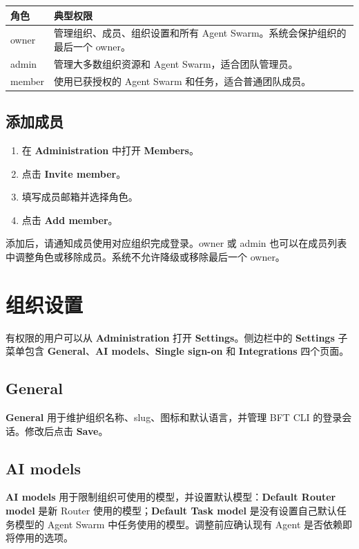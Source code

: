 \documentclass[UTF8,a4paper,11pt]{ctexart}
\begin{document}
\begin{longtable}{p{3cm}p{10.8cm}}
\toprule
角色 & 典型权限 \\
\midrule
owner & 管理组织、成员、组织设置和所有 Agent Swarm。系统会保护组织的最后一个 owner。 \\
admin & 管理大多数组织资源和 Agent Swarm，适合团队管理员。 \\
member & 使用已获授权的 Agent Swarm 和任务，适合普通团队成员。 \\
\bottomrule
\end{longtable}

\subsection{添加成员}

\begin{enumerate}
  \item 在 \textbf{Administration} 中打开 \textbf{Members}。
  \item 点击 \textbf{Invite member}。
  \item 填写成员邮箱并选择角色。
  \item 点击 \textbf{Add member}。
\end{enumerate}

添加后，请通知成员使用对应组织完成登录。owner 或 admin 也可以在成员列表中调整角色或移除成员。系统不允许降级或移除最后一个 owner。

\section{组织设置}

有权限的用户可以从 \textbf{Administration} 打开 \textbf{Settings}。侧边栏中的 \textbf{Settings} 子菜单包含 \textbf{General}、\textbf{AI models}、\textbf{Single sign-on} 和 \textbf{Integrations} 四个页面。

\subsection{General}

\textbf{General} 用于维护组织名称、slug、图标和默认语言，并管理 BFT CLI 的登录会话。修改后点击 \textbf{Save}。

\subsection{AI models}

\textbf{AI models} 用于限制组织可使用的模型，并设置默认模型：\textbf{Default Router model} 是新 Router 使用的模型；\textbf{Default Task model} 是没有设置自己默认任务模型的 Agent Swarm 中任务使用的模型。调整前应确认现有 Agent 是否依赖即将停用的选项。
\end{document}
